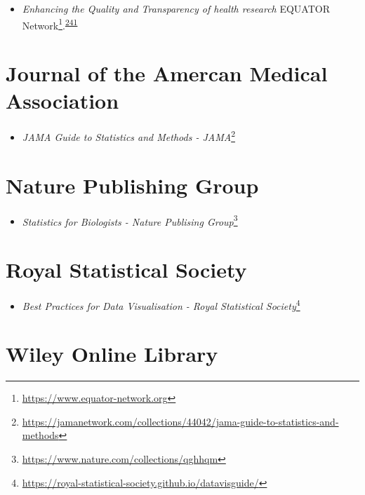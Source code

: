 \documentclass[
  a4paper,
]{book}
\providecommand{\tightlist}{%
  \setlength{\itemsep}{0pt}\setlength{\parskip}{0pt}}
\renewcommand{\href}[2]{#2\footnote{\url{#1}}}
\begin{document}
\begin{itemize}
\tightlist
\item
  \emph{Enhancing the Quality and Transparency of health research} \href{https://www.equator-network.org}{EQUATOR Network}.\textsuperscript{\protect\hyperlink{ref-Altman2008}{241}}
\end{itemize}

\hypertarget{journal-of-the-amercan-medical-association}{%
\section*{Journal of the Amercan Medical Association}\label{journal-of-the-amercan-medical-association}}

\begin{itemize}
\tightlist
\item
  \href{https://jamanetwork.com/collections/44042/jama-guide-to-statistics-and-methods}{\emph{JAMA Guide to Statistics and Methods - JAMA}}
\end{itemize}

\hypertarget{nature-publishing-group}{%
\section*{Nature Publishing Group}\label{nature-publishing-group}}

\begin{itemize}
\tightlist
\item
  \href{https://www.nature.com/collections/qghhqm}{\emph{Statistics for Biologists - Nature Publising Group}}
\end{itemize}

\hypertarget{royal-statistical-society}{%
\section*{Royal Statistical Society}\label{royal-statistical-society}}

\begin{itemize}
\tightlist
\item
  \href{https://royal-statistical-society.github.io/datavisguide/}{\emph{Best Practices for Data Visualisation - Royal Statistical Society}}
\end{itemize}

\hypertarget{wiley-online-library}{%
\section*{Wiley Online Library}\label{wiley-online-library}}
\end{document}
